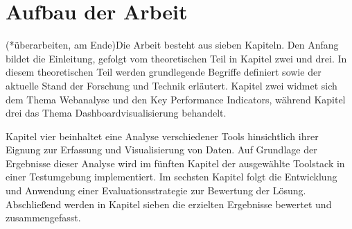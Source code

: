 \section{Aufbau der Arbeit}
\label{sec:aufbau}
(*überarbeiten, am Ende)Die Arbeit besteht aus sieben Kapiteln. Den Anfang bildet die Einleitung, gefolgt vom theoretischen Teil in Kapitel zwei und drei. In diesem theoretischen Teil werden grundlegende Begriffe definiert sowie der aktuelle Stand der Forschung und Technik erläutert. Kapitel zwei widmet sich dem Thema Webanalyse und den Key Performance Indicators, während Kapitel drei das Thema Dashboardvisualisierung behandelt.

Kapitel vier beinhaltet eine Analyse verschiedener Tools hinsichtlich ihrer Eignung zur Erfassung und Visualisierung von Daten. Auf Grundlage der Ergebnisse dieser Analyse wird im fünften Kapitel der ausgewählte Toolstack in einer Testumgebung implementiert. Im sechsten Kapitel folgt die Entwicklung und Anwendung einer Evaluationsstrategie zur Bewertung der Lösung. Abschließend werden in Kapitel sieben die erzielten Ergebnisse bewertet und zusammengefasst.